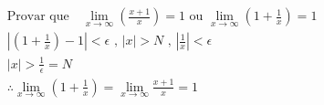 \begin{ex}
\begin{align}
&\text{Provar que} \quad \lim_{x\rightarrow \infty} (\frac{x+1}{x})=1 \text{  ou  } \lim_{x\rightarrow \infty } (1+\frac{1}{x})=1\nonumber\\
&\left|(1+\frac{1}{x})-1\right|<\epsilon\text{ , }\left|x\right|>N\text{ , }\left|\frac{1}{x}\right|<\epsilon\nonumber\\
&\left|x\right|>\frac{1}{\epsilon}=N\nonumber\\
&\therefore\lim_{x\rightarrow \infty} (1+\frac{1}{x}) = \lim_{x\rightarrow \infty} \frac{x+1}{x}=1\nonumber
\end{align}
\end{ex}